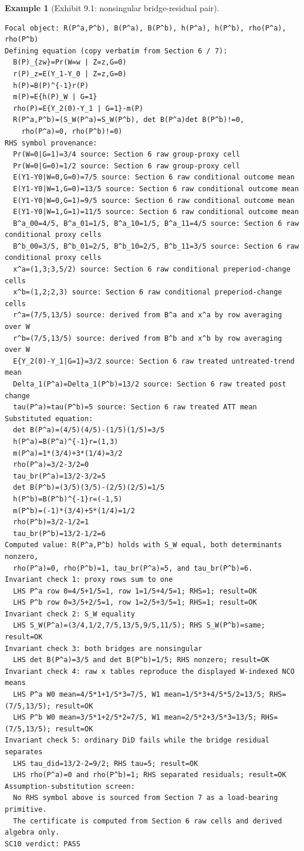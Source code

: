 \documentclass[11pt]{article}
\theoremstyle{definition}
\newtheorem{example}{Example}
\theoremstyle{plain}
\theoremstyle{remark}
\begin{document}
\begin{example}[Exhibit 9.1: nonsingular bridge-residual pair]
\begin{verbatim}
Focal object: R(P^a,P^b), B(P^a), B(P^b), h(P^a), h(P^b), rho(P^a), rho(P^b)
Defining equation (copy verbatim from Section 6 / 7):
  B(P)_{zw}=Pr(W=w | Z=z,G=0)
  r(P)_z=E(Y_1-Y_0 | Z=z,G=0)
  h(P)=B(P)^{-1}r(P)
  m(P)=E{h(P)_W | G=1}
  rho(P)=E{Y_2(0)-Y_1 | G=1}-m(P)
  R(P^a,P^b)=(S_W(P^a)=S_W(P^b), det B(P^a)det B(P^b)!=0,
    rho(P^a)=0, rho(P^b)!=0)
RHS symbol provenance:
  Pr(W=0|G=1)=3/4 source: Section 6 raw group-proxy cell
  Pr(W=0|G=0)=1/2 source: Section 6 raw group-proxy cell
  E(Y1-Y0|W=0,G=0)=7/5 source: Section 6 raw conditional outcome mean
  E(Y1-Y0|W=1,G=0)=13/5 source: Section 6 raw conditional outcome mean
  E(Y1-Y0|W=0,G=1)=9/5 source: Section 6 raw conditional outcome mean
  E(Y1-Y0|W=1,G=1)=11/5 source: Section 6 raw conditional outcome mean
  B^a_00=4/5, B^a_01=1/5, B^a_10=1/5, B^a_11=4/5 source: Section 6 raw conditional proxy cells
  B^b_00=3/5, B^b_01=2/5, B^b_10=2/5, B^b_11=3/5 source: Section 6 raw conditional proxy cells
  x^a=(1,3;3,5/2) source: Section 6 raw conditional preperiod-change cells
  x^b=(1,2;2,3) source: Section 6 raw conditional preperiod-change cells
  r^a=(7/5,13/5) source: derived from B^a and x^a by row averaging over W
  r^b=(7/5,13/5) source: derived from B^b and x^b by row averaging over W
  E{Y_2(0)-Y_1|G=1}=3/2 source: Section 6 raw treated untreated-trend mean
  Delta_1(P^a)=Delta_1(P^b)=13/2 source: Section 6 raw treated post change
  tau(P^a)=tau(P^b)=5 source: Section 6 raw treated ATT mean
Substituted equation:
  det B(P^a)=(4/5)(4/5)-(1/5)(1/5)=3/5
  h(P^a)=B(P^a)^{-1}r=(1,3)
  m(P^a)=1*(3/4)+3*(1/4)=3/2
  rho(P^a)=3/2-3/2=0
  tau_br(P^a)=13/2-3/2=5
  det B(P^b)=(3/5)(3/5)-(2/5)(2/5)=1/5
  h(P^b)=B(P^b)^{-1}r=(-1,5)
  m(P^b)=(-1)*(3/4)+5*(1/4)=1/2
  rho(P^b)=3/2-1/2=1
  tau_br(P^b)=13/2-1/2=6
Computed value: R(P^a,P^b) holds with S_W equal, both determinants nonzero,
  rho(P^a)=0, rho(P^b)=1, tau_br(P^a)=5, and tau_br(P^b)=6.
Invariant check 1: proxy rows sum to one
  LHS P^a row 0=4/5+1/5=1, row 1=1/5+4/5=1; RHS=1; result=OK
  LHS P^b row 0=3/5+2/5=1, row 1=2/5+3/5=1; RHS=1; result=OK
Invariant check 2: S_W equality
  LHS S_W(P^a)=(3/4,1/2,7/5,13/5,9/5,11/5); RHS S_W(P^b)=same; result=OK
Invariant check 3: both bridges are nonsingular
  LHS det B(P^a)=3/5 and det B(P^b)=1/5; RHS nonzero; result=OK
Invariant check 4: raw x tables reproduce the displayed W-indexed NCO means
  LHS P^a W0 mean=4/5*1+1/5*3=7/5, W1 mean=1/5*3+4/5*5/2=13/5; RHS=(7/5,13/5); result=OK
  LHS P^b W0 mean=3/5*1+2/5*2=7/5, W1 mean=2/5*2+3/5*3=13/5; RHS=(7/5,13/5); result=OK
Invariant check 5: ordinary DiD fails while the bridge residual separates
  LHS tau_did=13/2-2=9/2; RHS tau=5; result=OK
  LHS rho(P^a)=0 and rho(P^b)=1; RHS separated residuals; result=OK
Assumption-substitution screen:
  No RHS symbol above is sourced from Section 7 as a load-bearing primitive.
  The certificate is computed from Section 6 raw cells and derived algebra only.
SC10 verdict: PASS
\end{verbatim}
\end{example}
\end{document}
